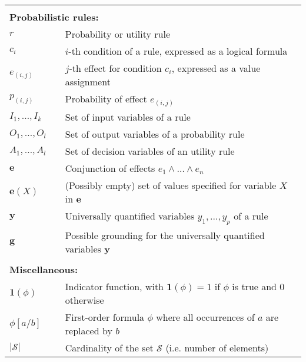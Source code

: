 \begin{longtable}{lp{5mm}p{11cm}}
&&  \vspace{3mm} \\
\multicolumn{3}{l}{\textbf{Probabilistic rules:}} \vspace{2mm} \\
$r$ && Probability or utility rule \\
$c_i$ && $i$-th condition of a rule, expressed as a logical formula \\
$e_{(i,j)}$ && $j$-th effect for condition $c_i$, expressed as a value assignment \\
$p_{(i,j)}$ && Probability of effect $e_{(i,j)}$ \\
$I_1, \dots, I_{k}$  && Set of input variables of a rule\\
$O_1, \dots, O_{l}$ && Set of output variables of a probability rule \\
$A_1, \dots, A_{l}$ && Set of decision variables of an utility rule \\
$\mathbf{e}$ && Conjunction of effects $e_1 \land \dots \land e_n$ \\
$\mathbf{e}(X)$ && (Possibly empty) set of values specified for variable $X$ in $\mathbf{e}$ \\
$\mathbf{y}$ && Universally quantified variables $y_1, \dots, y_p$ of a rule  \\
$\mathbf{g}$ && Possible grounding for the universally quantified variables $\mathbf{y}$ \\
&&  \vspace{3mm} \\
\multicolumn{3}{l}{\textbf{Miscellaneous:}} \vspace{2mm} \\
$\mathbf{1}(\phi)$ && Indicator function, with $\mathbf{1}(\phi) = 1$ if $\phi$ is true and 0 otherwise \\
$\phi[a / b]$ && First-order formula $\phi$ where all occurrences of $a$ are replaced by $b$ \\
$|\mathcal{S}|$ && Cardinality of the set $\mathcal{S}$ (i.e. number of elements) 
\end{longtable}
